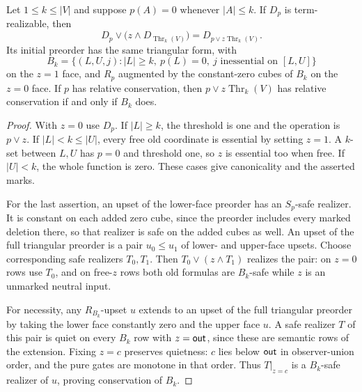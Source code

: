 \begin{proposition}
\label{core:prop:conservation-threshold-apex-reduction}
Let $1\leq k\leq|V|$ and suppose $p(A)=0$ whenever $|A|\leq k$.
If $D_p$ is term-realizable, then
\[
 D_p\lor\bigl(z\land D_{\operatorname{Thr}_k(V)}\bigr)
   =D_{p\lor z\operatorname{Thr}_k(V)}.
\]
Its initial preorder has the same triangular form, with
\[
 B_k=\{(L,U,j):|L|\geq k,\ p(L)=0,
                    \ j\text{ inessential on }[L,U]\}
\]
on the $z=1$ face, and $R_p$ augmented by the constant-zero cubes of
$B_k$ on the $z=0$ face.
If $p$ has relative conservation, then
$p\lor z\operatorname{Thr}_k(V)$ has relative conservation if and only
if $B_k$ does.
\end{proposition}
\begin{proof}
With $z=0$ use $D_p$. If $|L|\geq k$, the threshold is one and the
operation is $p\lor z$.
If $|L|<k\leq|U|$, every free old coordinate is essential by setting
$z=1$. A $k$-set between $L,U$ has $p=0$ and threshold one, so $z$ is
essential too when free. If $|U|<k$, the whole function is zero. These cases give
canonicality and the asserted marks.

For the last assertion, an upset of the lower-face preorder has an
$S_p$-safe realizer. It is constant on each added zero cube, since the
preorder includes every marked deletion there, so that realizer is safe
on the added cubes as well. An upset of the full triangular preorder is
a pair $u_0\leq u_1$ of lower- and upper-face upsets. Choose corresponding
safe realizers $T_0,T_1$. Then $T_0\lor(z\land T_1)$ realizes the pair:
on $z=0$ rows use $T_0$, and on free-$z$ rows both old formulas are
$B_k$-safe while $z$ is an unmarked neutral input.

For necessity, any $R_{B_k}$-upset $u$ extends to an upset of the full
triangular preorder by taking the lower face constantly zero and the
upper face $u$. A safe realizer $T$ of this pair is quiet on every
$B_k$ row with $z=\mathsf{out}$, since these are semantic rows of the extension.
Fixing $z=c$ preserves quietness: $c$ lies below $\mathsf{out}$ in observer-union
order, and the pure gates are monotone in that order. Thus $T|_{z=c}$
is a $B_k$-safe realizer of $u$, proving conservation of $B_k$.
\end{proof}

